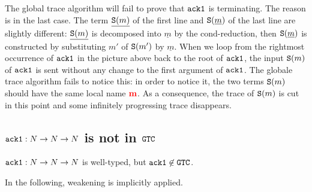The global trace algorithm will fail to prove that ${\tt ack1}$ is terminating. The reason is in the last case. 
The term $\underline{{\tt S}(m)}$ of the first line and ${\tt S}(\underline{m})$ of the last line are slightly 
different: $\underline{{\tt S}(m)}$ is decomposed into $\underline{m}$ by the $\text{cond}$-reduction, 
then ${\tt S}(\underline{m})$ is constructed by substituting $m'$ of ${\tt S}(m')$ by $\underline{m}$. 
When we loop from the rightmost occurrence of ${\tt ack1}$ 
in the picture above back to the root of ${\tt ack1}$, the input ${\tt S}(m)$ of ${\tt ack1}$ is sent without any change to the first argument of ${\tt ack1}$. The globale trace algorithm fails to notice this: 
in order to notice it, the two terms ${\tt S}(m)$ should have the same local name ${{\bf \color{red}{m}}}$.
As a consequence, the trace of ${\tt S}(m)$ is cut in this point and some infinitely progressing trace
disappears.



\subsection{${\tt ack1}:{N}\to{N}\to{N}$ is not in ${\tt GTC}$}

\begin{claim}
  ${\tt ack1}:{N}\to{N}\to{N}$ is well-typed, but ${\tt ack1} \not \in {\tt GTC}$.
\end{claim}

In the following, weakening is implicitly applied. 

